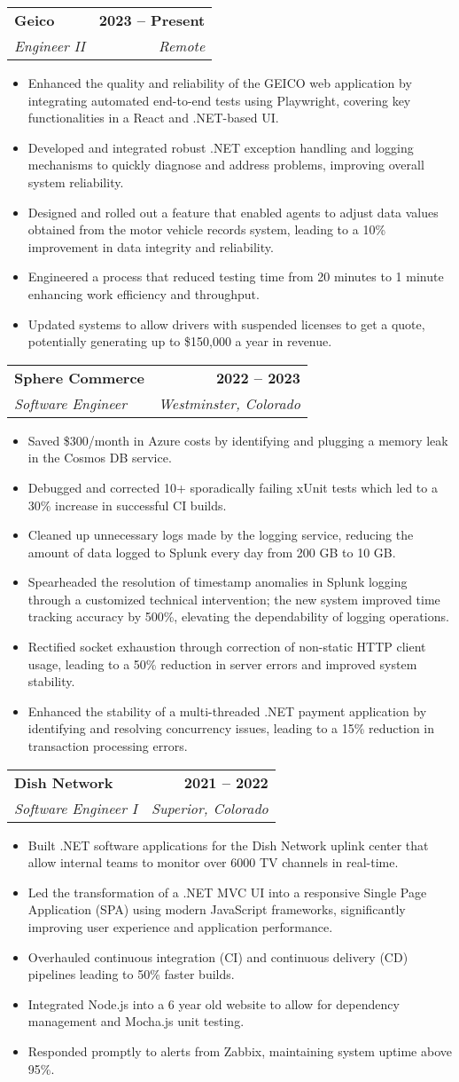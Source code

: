 \documentclass[letterpaper,11pt]{article}
\makeatletter
\newcommand{\resumeItem}[1]{
  \item\small{
    {#1 \vspace{2pt}}
  }
}
\newcommand{\resumeSubheading}[4]{
  \vspace{-2pt}\item
    \begin{tabular*}{1.0\textwidth}[t]{l@{\extracolsep{\fill}}r}
      \textbf{#1} & \textbf{\small #2} \\
      \textit{\small#3} & \textit{\small #4} \\
    \end{tabular*}\vspace{-7pt}
}
\newcommand{\resumeItemListStart}{\begin{itemize}}
\newcommand{\resumeItemListEnd}{\end{itemize}\vspace{-5pt}}
\makeatother
\begin{document}
  	\resumeSubheading
      {Geico}{2023 -- Present}
      {Engineer II}{Remote}
      \resumeItemListStart
	\resumeItem{Enhanced the quality and reliability of the GEICO web application by integrating automated end-to-end tests using Playwright, covering key functionalities in a React and .NET-based UI.}   
	\resumeItem{Developed and integrated robust .NET exception handling and logging mechanisms to quickly diagnose and address problems, improving overall system reliability.}
	\resumeItem{Designed and rolled out a feature that enabled agents to adjust data values obtained from the motor vehicle records system, leading to a 10\% improvement in data integrity and reliability.}
	\resumeItem{Engineered a process that reduced testing time from 20 minutes to 1 minute enhancing work efficiency and throughput.} 
	\resumeItem{Updated systems to allow drivers with suspended licenses to get a quote, potentially generating up to \$150,000 a year in revenue.}	
      \resumeItemListEnd

    \resumeSubheading
      {Sphere Commerce}{2022 -- 2023}
      {Software Engineer}{Westminster, Colorado}
      \resumeItemListStart
	\resumeItem{Saved \$300/month in Azure costs by identifying and plugging a memory leak in the Cosmos DB service.}
        \resumeItem{Debugged and corrected 10+ sporadically failing xUnit tests which led to a 30\% increase in successful CI builds.}
	\resumeItem{Cleaned up unnecessary logs made by the logging service, reducing the amount of data logged to Splunk every day from 200 GB to 10 GB.}
        \resumeItem{
Spearheaded the resolution of timestamp anomalies in Splunk logging through a customized technical intervention; the new system improved time tracking accuracy by 500\%, elevating the dependability of logging operations. }       
	\resumeItem{Rectified socket exhaustion through correction of non-static HTTP client usage, leading to a 50\% reduction in server errors and improved system stability.}
	\resumeItem{Enhanced the stability of a multi-threaded .NET payment application by identifying and resolving concurrency issues, leading to a 15\% reduction in transaction processing errors.}
      \resumeItemListEnd

    \resumeSubheading
      {Dish Network}{2021 -- 2022}
      {Software Engineer I}{Superior, Colorado}
      \resumeItemListStart
        \resumeItem{Built .NET software applications for the Dish Network uplink center that allow internal teams to monitor over 6000 TV channels in real-time.}
	\resumeItem{Led the transformation of a .NET MVC UI into a responsive Single Page Application (SPA) using modern JavaScript frameworks, significantly improving user experience and application performance.}
	\resumeItem{Overhauled continuous integration (CI) and continuous delivery (CD) pipelines leading to 50\% faster builds.}
        \resumeItem{Integrated Node.js into a 6 year old website to allow for dependency management and Mocha.js unit testing.}
        \resumeItem{Responded promptly to alerts from Zabbix, maintaining system uptime above 95\%.}
    \resumeItemListEnd
\end{document}
